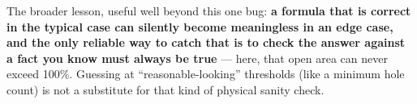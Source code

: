 The broader lesson, useful well beyond this one bug: \textbf{a formula that
is correct in the typical case can silently become meaningless in an edge
case, and the only reliable way to catch that is to check the answer
against a fact you know must always be true} --- here, that open area can
never exceed 100\%. Guessing at ``reasonable-looking'' thresholds (like a
minimum hole count) is not a substitute for that kind of physical sanity
check.

\newpage
